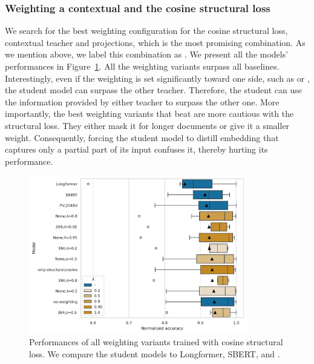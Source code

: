 \subsubsection{Weighting a contextual and the cosine structural loss}

We search for the best weighting configuration for the cosine structural loss,
 contextual teacher and 
projections, which is the most promising combination. As we mention above, we
label this combination as . We
present all the models' performances in Figure~\ref{fig:cos_weighting}. All the
weighting variants surpass all baselines. Interestingly, even if the weighting
is set significantly toward one side, such as  or
, the student model can surpass the other teacher.
Therefore, the student can use the information provided by either teacher to
surpass the other one. More importantly, the best weighting variants that beat
 are more cautious with the structural loss. They
either mask it for longer documents or give it a smaller weight. Consequently,
forcing the student model to distill embedding that captures only a partial
part of its input confuses it, thereby hurting its performance.

\begin{figure}
  \centering
  \includegraphics[width=0.85\textwidth]{img/cos_weighting.pdf}

  \caption{Performances of all weighting variants trained with cosine
  structural loss. We compare the student models to Longformer, SBERT, and
  .}

  \label{fig:cos_weighting}

\end{figure}

